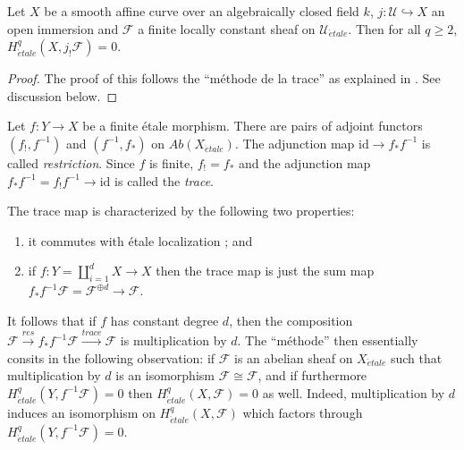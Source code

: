 \begin{lemma}
\label{lemma-vanishing-easier}
Let $X$ be a smooth affine curve over an algebraically closed field $k$, $j:
\mathcal{U} \hookrightarrow X$ an open immersion and $\mathcal{F}$ a finite
locally constant sheaf on $\mathcal{U}_{\acute{e}tale}$. Then for all
$q \geq 2$, $H_{\acute{e}tale}^q(X, j_! \mathcal{F}) = 0$.
\end{lemma}

\begin{proof}
The proof of this follows the
``m\'ethode de la trace''
as explained in \cite[Expos\'e IX, \S5]{SGA4}.
See discussion below.
\end{proof}

\begin{definition}
\label{definition-trace-map}
Let $f : Y \to X$ be a finite \'etale morphism. There are pairs of adjoint
functors $(f_!, f^{-1})$ and $(f^{-1}, f_*)$ on
$\textit{Ab}(X_{\acute{e}tale})$. The
adjunction map $\text{id} \to f_* f^{-1}$ is called {\it restriction}. Since
$f$ is finite, $f_! = f_*$ and the adjunction map $f_* f^{-1} = f_! f^{-1} \to
\text{id}$ is called the {\it trace}.
\end{definition}

\noindent
The trace map is characterized by the following two properties:
\begin{enumerate}
\item
it commutes with \'etale localization ; and
\item
if $f: Y = \coprod_{i=1}^d X \to X$ then the trace map is just the sum map
$f_*f^{-1} \mathcal{F} = \mathcal{F}^{\oplus d} \to \mathcal{F}$.
\end{enumerate}
It follows that if $f$ has constant degree $d$, then the composition
$\mathcal{F} \xrightarrow{res} f_* f^{-1} \mathcal{F} \xrightarrow{trace}
\mathcal{F}$ is multiplication by $d$. The ``m\'ethode'' then essentially
consits in the following observation: if $\mathcal{F}$ is an abelian sheaf on
$X_{\acute{e}tale}$ such that multiplication by $d$ is an isomorphism
$\mathcal{F} \cong \mathcal{F}$, and if furthermore
$H_{\acute{e}tale}^q(Y, f^{-1}\mathcal{F}) = 0$ then
$H_{\acute{e}tale}^q(X, \mathcal{F}) = 0$ as well.
Indeed, multiplication by $d$ induces an
isomorphism on $H_{\acute{e}tale}^q(X, \mathcal{F})$ which factors through
$H_{\acute{e}tale}^q(Y, f^{-1}\mathcal{F})= 0$.

